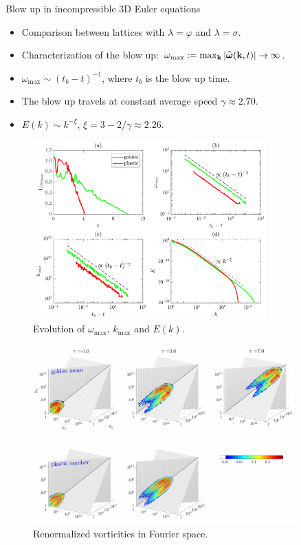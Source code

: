 \documentclass{beamer} %
\begin{document}
\begin{frame}{Blow up in incompressible 3D Euler equations}
  \begin{itemize}
    \item Comparison between lattices with $\lambda=\varphi$ and $\lambda=\sigma$.
    \item Characterization of the blow up: $\omega_\text{max}:=\max_{\boldsymbol{\mathrm{k}}} |\widehat{\boldsymbol{\mathrm{\omega}}}(\boldsymbol{\mathrm{k}},t)|\to \infty$.
    \item $\omega_\text{max}\sim (t_b - t)^{-1}$, where $t_b$ is the blow up time.
    \item The blow up travels at constant average speed $\gamma \approx 2.70$.
    \item $E(k) \sim k^{-\xi}$, $\xi =3-2/\gamma\approx 2.26$.
  \end{itemize}
  \begin{minipage}{0.49\textwidth}
    \begin{figure}
      \centering
      \includegraphics[width=0.8\textwidth]{images/blowup-1.png}
      \caption{Evolution of $\omega_\text{max}$, $k_\text{max}$ and $E(k)$. \cite{campolina}}
    \end{figure}
  \end{minipage}\hfill
  \begin{minipage}{0.49\textwidth}
    \begin{figure}
      \centering
      \includegraphics[width=0.9\textwidth]{images/blowup-2.png}
      \caption{Renormalized vorticities in Fourier space. \cite{campolina}}
    \end{figure}
  \end{minipage}
  \vspace{-0.5cm}
\end{frame}
\end{document}
